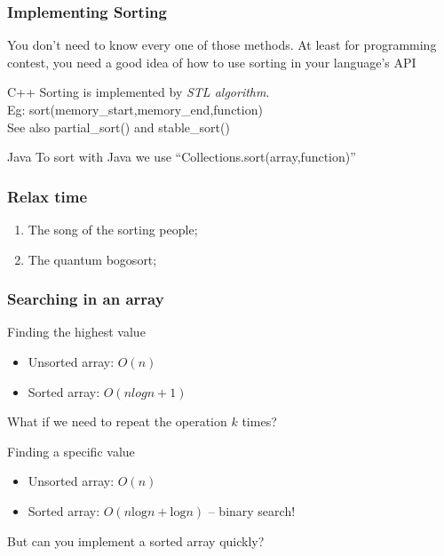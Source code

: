\documentclass{beamer}
\begin{document}
\begin{frame}
  \frametitle{Implementing Sorting} 

  {\small 
    You don't need to know every one of those methods. At least for
    programming contest, you need a good idea of how to use sorting in
    your language's API

    \medskip
    
  \begin{block}{C++}
    Sorting is implemented by \emph{STL algorithm}.\\
    Eg: sort(memory\_start,memory\_end,function)\\
    See also partial\_sort() and stable\_sort()
  \end{block}
  \begin{block}{Java}
    To sort with Java we use ``Collections.sort(array,function)''    
  \end{block}
  }
\end{frame}

\begin{frame}
  \frametitle{Relax time}
  \begin{enumerate}
  \item The song of the sorting people;
    \vfill
  \item The quantum bogosort;
  \end{enumerate}
\end{frame}


\begin{frame}
  \frametitle{Searching in an array}

  \begin{block}{Finding the highest value}
    \begin{itemize}
    \item Unsorted array: $O(n)$
    \item Sorted array: $O(nlogn + 1)$
    \end{itemize}
    What if we need to repeat the operation $k$ times?
  \end{block}

  \begin{block}{Finding a specific value}
    \begin{itemize}
    \item Unsorted array: $O(n)$
    \item Sorted array: $O(n\text{log}n + \text{log}n)$ -- binary search!
    \end{itemize}
  \end{block}

  But can you implement a sorted array quickly?
\end{frame}
\end{document}
